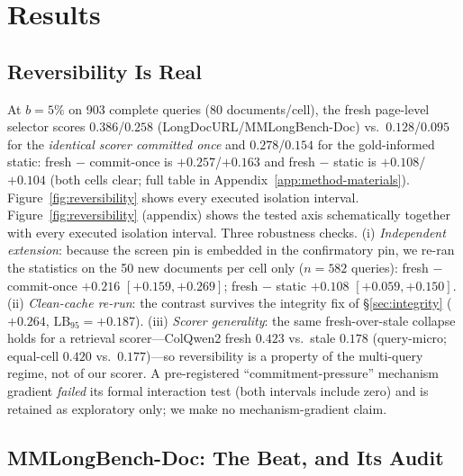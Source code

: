 \documentclass[letterpaper]{article} %
\newcommand{\lb}{\mathrm{LB}_{95}}
\begin{document}
\section{Results}\label{sec:results}

\subsection{Reversibility Is Real}\label{sec:results-isolation}

At $b=5\%$ on 903 complete queries (80 documents/cell), the fresh page-level selector scores $0.386$/$0.258$ (LongDocURL/MMLongBench-Doc) vs.\ $0.128$/$0.095$ for the \emph{identical scorer committed once} and $0.278$/$0.154$ for the gold-informed static: fresh $-$ commit-once is $+0.257$/$+0.163$ and fresh $-$ static is $+0.108$/$+0.104$ (both cells clear; full table in Appendix~\ref{app:method-materials}). Figure~\ref{fig:reversibility} shows every executed isolation interval.
Figure~\ref{fig:reversibility} (appendix) shows the tested axis schematically together with every executed isolation interval. Three robustness checks. (i) \emph{Independent extension}: because the screen pin is embedded in the confirmatory pin, we re-ran the statistics on the 50 new documents per cell only ($n=582$ queries): fresh $-$ commit-once $+0.216$ $[+0.159,+0.269]$; fresh $-$ static $+0.108$ $[+0.059,+0.150]$. (ii) \emph{Clean-cache re-run}: the contrast survives the integrity fix of \S\ref{sec:integrity} ($+0.264$, $\lb=+0.187$). (iii) \emph{Scorer generality}: the same fresh-over-stale collapse holds for a retrieval scorer---ColQwen2 fresh $0.423$ vs.\ stale $0.178$ (query-micro; equal-cell $0.420$ vs.\ $0.177$)---so reversibility is a property of the multi-query regime, not of our scorer. A pre-registered ``commitment-pressure'' mechanism gradient \emph{failed} its formal interaction test (both intervals include zero) and is retained as exploratory only; we make no mechanism-gradient claim.

\subsection{MMLongBench-Doc: The Beat, and Its Audit}\label{sec:results-mmlo}
\end{document}
